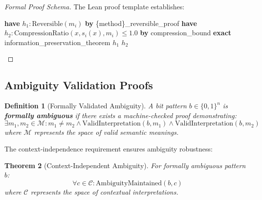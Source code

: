 \documentclass[11pt,a4paper]{article}
\newtheorem{theorem}{Theorem}[section]
\newtheorem{definition}[theorem]{Definition}
\begin{document}
\begin{proof}[Formal Proof Schema]
The Lean proof template establishes:
\begin{algorithmic}[1]
\STATE \textbf{have} $h_1: \text{Reversible}(m_i)$ \textbf{by} \{method\}\_reversible\_proof
\STATE \textbf{have} $h_2: \text{CompressionRatio}(x, s_i(x), m_i) \leq 1.0$ \textbf{by} compression\_bound
\STATE \textbf{exact} information\_preservation\_theorem $h_1$ $h_2$
\end{algorithmic}
\end{proof}

\subsection{Ambiguity Validation Proofs}

\begin{definition}[Formally Validated Ambiguity]
A bit pattern $b \in \{0,1\}^n$ is \textbf{formally ambiguous} if there exists a machine-checked proof demonstrating:
\begin{equation}
\exists m_1, m_2 \in \mathcal{M}: m_1 \neq m_2 \land \text{ValidInterpretation}(b, m_1) \land \text{ValidInterpretation}(b, m_2)
\label{eq:formal-ambiguity}
\end{equation}
where $\mathcal{M}$ represents the space of valid semantic meanings.
\end{definition}

The context-independence requirement ensures ambiguity robustness:

\begin{theorem}[Context-Independent Ambiguity]
For formally ambiguous pattern $b$:
\begin{equation}
\forall c \in \mathcal{C}: \text{AmbiguityMaintained}(b, c)
\label{eq:context-independence}
\end{equation}
where $\mathcal{C}$ represents the space of contextual interpretations.
\end{theorem}
\end{document}
